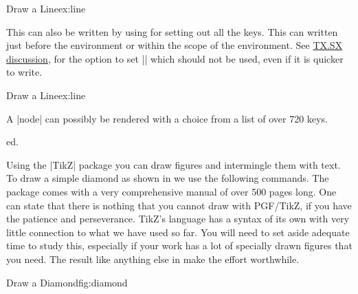 \begin{texexample}{Draw a Line}{ex:line}
\end{texexample}

This can also be written by using  for setting out all the keys. This can written just before the environment or within the scope of the environment. See \href{https://tex.stackexchange.com/questions/52372/should-tikzset-or-tikzstyle-be-used-to-define-tikz-styles}{TX.SX discussion}, for the option to set |\tikzstyle| which should not be used, even if it is quicker to write.


\begin{texexample}{Draw a Line}{ex:line}
\end{texexample}

A |node| can possibly be rendered with a choice from a list of over 720 keys.

ed. 



Using the |TikZ| package you can draw figures and intermingle them with text. To draw a simple diamond as shown in  we use
the following commands. The package comes with a very comprehensive manual of over 500 pages long. One can state that there is nothing that you cannot draw with PGF/TikZ, if you have the patience and perseverance. TikZ's language has a syntax of its own with very little connection to what we have used so far. You will need to set aside adequate time to study this, especially if your work has a lot of specially drawn figures that you need. The result like anything else in \tex make the effort worthwhile.

\begin{texexample}{Draw a Diamond}{fig:diamond}
\end{texexample}


